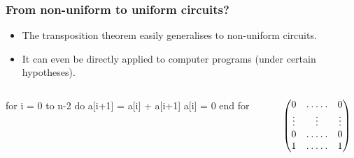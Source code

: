 \documentclass[10pt]{beamer}
\begin{document}

\begin{frame}[fragile]
  \frametitle{From non-uniform to uniform circuits?}
  
  {\large
    \begin{itemize}
    \item The transposition theorem easily generalises to non-uniform
      circuits.
    \item It can even be directly applied to computer programs (under
      certain hypotheses).
    \end{itemize}}

    \begin{columns}

    \begin{column}{0.5\textwidth}
      \begin{center}
        \begin{minipage}{0.7\textwidth}
\begin{semiverbatim}
  for i = 0 to n-2 do
    a[i+1] = a[i] + a[i+1]
    a[i] = 0
  end for
\end{semiverbatim}
        \end{minipage}
      \end{center}
    \end{column}

    \begin{column}{0.5\textwidth}

      \begin{equation*}
        \begin{pmatrix}
          0 & \hdotsfor{3} & 0\\
          \vdots  &  &\vdots&& \vdots \\
          0 & \hdotsfor{3} & 0\\
          1 & \hdotsfor{3} & 1
        \end{pmatrix}
      \end{equation*}

    \end{column}
  \end{columns}


\end{frame}

\end{document}
